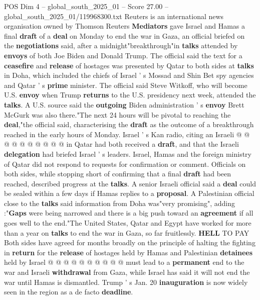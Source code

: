 \begin{textsample}{POS Dim 4 – global\_south\_2025\_01 – Score 27.00 – global\_south\_2025\_01/119968300.txt}  \label{ex:f4_pos_015}
Reuters is an international news organisation owned by Thomson Reuters \textbf{Mediators} gave Israel and Hamas a final \textbf{draft} of a \textbf{deal} on Monday to end the war in Gaza, an official briefed on the \textbf{negotiations} said, after a midnight"breakthrough"in \textbf{talks} attended by \textbf{envoys} of both Joe Biden and Donald Trump.
The official said the text for a \textbf{ceasefire} and \textbf{release} of hostages was presented by Qatar to both sides at \textbf{talks} in Doha, which included the chiefs of Israel ' s Mossad and Shin Bet spy agencies and Qatar ' s \textbf{prime} minister.
The official said Steve Witkoff, who will become U.S. \textbf{envoy} when Trump \textbf{returns} to the U.S. presidency next week, attended the \textbf{talks}.
A U.S. source said the \textbf{outgoing} Biden administration ' s \textbf{envoy} Brett McGurk was also there."The next 24 hours will be pivotal to reaching the \textbf{deal},"the official said, characterising the \textbf{draft} as the outcome of a breakthrough reached in the early hours of Monday.
Israel ' s Kan radio, citing an Israeli @ @ @ @ @ @ @ @ @ @ in Qatar had both received a \textbf{draft}, and that the Israeli \textbf{delegation} had briefed Israel ' s leaders.
Israel, Hamas and the foreign ministry of Qatar did not respond to requests for confirmation or comment.
Officials on both sides, while stopping short of confirming that a final \textbf{draft} had been reached, described progress at the \textbf{talks}.
A senior Israeli official said a \textbf{deal} could be sealed within a few days if Hamas replies to a \textbf{proposal}.
A Palestinian official close to the \textbf{talks} said information from Doha was"very promising", adding :"\textbf{Gaps} were being narrowed and there is a big push toward an \textbf{agreement} if all goes well to the end."The United States, Qatar and Egypt have worked for more than a year on \textbf{talks} to end the war in Gaza, so far fruitlessly. \textbf{HELL} TO PAY Both sides have agreed for months broadly on the principle of halting the fighting in \textbf{return} for the \textbf{release} of hostages held by Hamas and Palestinian \textbf{detainees} held by Israel @ @ @ @ @ @ @ @ @ @ must lead to a \textbf{permanent} end to the war and Israeli \textbf{withdrawal} from Gaza, while Israel has said it will not end the war until Hamas is dismantled.
Trump ' s Jan. 20 \textbf{inauguration} is now widely seen in the region as a de facto \textbf{deadline}.

\end{textsample}
